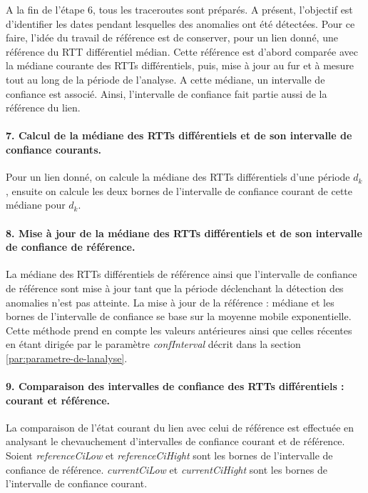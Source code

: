 A la fin de l'étape 6, tous les traceroutes sont préparés. A présent, l'objectif est d'identifier les dates pendant lesquelles des anomalies ont été détectées. Pour ce faire, l'idée du travail de référence est de conserver, pour un lien donné, une référence du RTT différentiel médian.  Cette référence est d'abord comparée avec la médiane courante des RTTs différentiels,  puis,  mise à jour au fur et à mesure   tout au long de la période de l'analyse. A cette médiane, un intervalle de confiance est associé. Ainsi, l'intervalle de confiance fait partie aussi de la référence du lien. 


\paragraph{7. Calcul de la médiane des RTTs différentiels et  de son intervalle de confiance courants.} Pour un lien donné, on calcule la médiane des RTTs différentiels d'une période $d_k$, ensuite on calcule les deux bornes de l'intervalle de confiance  courant de cette médiane pour $d_k$.  


\paragraph{8. Mise à jour de la médiane  des RTTs différentiels et de son intervalle  de confiance de  référence.} La médiane des RTTs différentiels de référence ainsi que l'intervalle de confiance de référence sont mise à jour tant que la période déclenchant la détection des anomalies n'est pas atteinte.  La mise à jour de la référence : médiane et les bornes de l'intervalle de confiance se base sur la moyenne mobile exponentielle. Cette méthode prend en compte les valeurs antérieures ainsi que celles récentes en étant dirigée par le paramètre \textit{confInterval} décrit dans la section \ref{par:parametre-de-lanalyse}.


\paragraph{9. Comparaison des intervalles de confiance  des RTTs différentiels : courant et référence.} 

La comparaison de l'état courant du lien avec celui de référence est effectuée en analysant le chevauchement d'intervalles de confiance  courant et de référence.  Soient 
 \textit{referenceCiLow} et \textit{referenceCiHight} sont les bornes de l'intervalle de confiance de référence.  \textit{currentCiLow} et \textit{currentCiHight} sont les bornes de l'intervalle de confiance courant.

